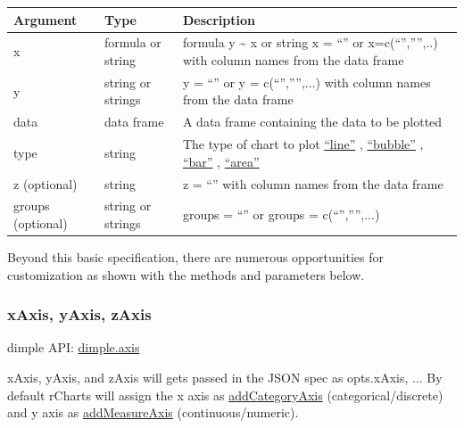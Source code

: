 \documentclass[letterpaper,10pt,english]{sphinxmanual}
\begin{document}
\begin{tabulary}{\linewidth}{|L|L|L|}
\hline
\textsf{\relax 
Argument
} & \textsf{\relax 
Type
} & \textsf{\relax 
Description
}\\
\hline
x
 & 
formula or string
 & 
formula y \textasciitilde{} x or string x = ``'' or x=c(``'','''',..) with column names from the data frame
\\

y
 & 
string or strings
 & 
y = ``'' or y = c(``'','''',...) with column names from the data frame
\\

data
 & 
data frame
 & 
A data frame containing the data to be plotted
\\

type
 & 
string
 & 
The type of chart to plot \href{https://github.com/PMSI-AlignAlytics/dimple/wiki/dimple.plot\#line}{``line''} , \href{https://github.com/PMSI-AlignAlytics/dimple/wiki/dimple.plot\#bubble}{``bubble''} , \href{https://github.com/PMSI-AlignAlytics/dimple/wiki/dimple.plot\#bar}{``bar''} , \href{https://github.com/PMSI-AlignAlytics/dimple/wiki/dimple.plot\#area}{``area''}
\\

z (optional)
 & 
string
 & 
z = ``'' with column names from the data frame
\\

groups (optional)
 & 
string or strings
 & 
groups = ``'' or groups = c(``'','''',...)
\\
\hline\end{tabulary}


Beyond this basic specification, there are numerous opportunities for customization as shown with the methods and parameters below.


\subsubsection{xAxis, yAxis, zAxis}
\label{dimple/api:xaxis-yaxis-zaxis}
dimple API: \href{https://github.com/PMSI-AlignAlytics/dimple/wiki/dimple.axis}{dimple.axis}

xAxis, yAxis, and zAxis will gets passed in the JSON spec as opts.xAxis, ...  By default rCharts will assign the x axis as \href{https://github.com/PMSI-AlignAlytics/dimple/wiki/dimple.chart\#addCategoryAxis}{addCategoryAxis} (categorical/discrete) and y axis as \href{https://github.com/PMSI-AlignAlytics/dimple/wiki/dimple.chart\#addMeasureAxis}{addMeasureAxis} (continuous/numeric).
\end{document}
